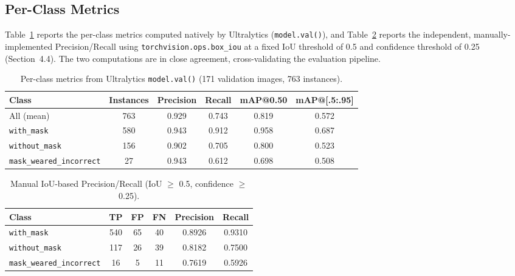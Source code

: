 \documentclass[12pt]{article}
\begin{document}
\subsection{Per-Class Metrics}
Table~\ref{tab:perclass} reports the per-class metrics computed natively by
Ultralytics (\texttt{model.val()}), and Table~\ref{tab:perclass-manual}
reports the independent, manually-implemented Precision/Recall using
\texttt{torchvision.ops.box\_iou} at a fixed IoU threshold of 0.5 and
confidence threshold of 0.25 (Section~4.4). The two computations are in
close agreement, cross-validating the evaluation pipeline.

\begin{table}[H]
\centering
\caption{Per-class metrics from Ultralytics \texttt{model.val()} (171 validation images, 763 instances).}
\label{tab:perclass}
\begin{tabular}{@{}lccccc@{}}
\toprule
\textbf{Class} & \textbf{Instances} & \textbf{Precision} & \textbf{Recall} & \textbf{mAP@0.50} & \textbf{mAP@[.5:.95]} \\
\midrule
All (mean)                & 763 & 0.929 & 0.743 & 0.819 & 0.572 \\
\texttt{with\_mask}              & 580 & 0.943 & 0.912 & 0.958 & 0.687 \\
\texttt{without\_mask}           & 156 & 0.902 & 0.705 & 0.800 & 0.523 \\
\texttt{mask\_weared\_incorrect} & 27  & 0.943 & 0.612 & 0.698 & 0.508 \\
\bottomrule
\end{tabular}
\end{table}

\begin{table}[H]
\centering
\caption{Manual IoU-based Precision/Recall (IoU $\geq$ 0.5, confidence $\geq$ 0.25).}
\label{tab:perclass-manual}
\begin{tabular}{@{}lccccc@{}}
\toprule
\textbf{Class} & \textbf{TP} & \textbf{FP} & \textbf{FN} & \textbf{Precision} & \textbf{Recall} \\
\midrule
\texttt{with\_mask}              & 540 & 65 & 40 & 0.8926 & 0.9310 \\
\texttt{without\_mask}           & 117 & 26 & 39 & 0.8182 & 0.7500 \\
\texttt{mask\_weared\_incorrect} & 16  & 5  & 11 & 0.7619 & 0.5926 \\
\bottomrule
\end{tabular}
\end{table}
\end{document}
